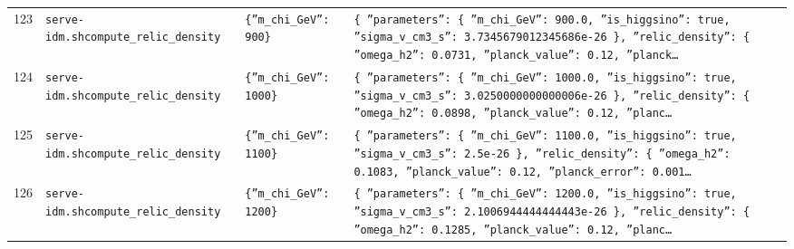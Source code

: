 \documentclass[11pt,a4paper]{article}
\begin{document}
\begin{longtable}{@{}p{}p{}p{}p{}@{}}
123 & \texttt{serve-idm.sh}\newline\texttt{compute\_\allowbreak{}relic\_\allowbreak{}density} & \texttt{\{''m\_\allowbreak{}chi\_\allowbreak{}GeV'':\allowbreak{} 900\}\allowbreak{}} & \texttt{\{   ''parameters'':\allowbreak{} \{     ''m\_\allowbreak{}chi\_\allowbreak{}GeV'':\allowbreak{} 900.0,\allowbreak{}     ''is\_\allowbreak{}higgsino'':\allowbreak{} true,\allowbreak{}     ''sigma\_\allowbreak{}v\_\allowbreak{}cm3\_\allowbreak{}s'':\allowbreak{} 3.7345679012345686e-26   \}\allowbreak{},\allowbreak{}   ''relic\_\allowbreak{}density'':\allowbreak{} \{     ''omega\_\allowbreak{}h2'':\allowbreak{} 0.0731,\allowbreak{}     ''planck\_\allowbreak{}value'':\allowbreak{} 0.12,\allowbreak{}     ''planck\ldots{}\allowbreak{}} \\
124 & \texttt{serve-idm.sh}\newline\texttt{compute\_\allowbreak{}relic\_\allowbreak{}density} & \texttt{\{''m\_\allowbreak{}chi\_\allowbreak{}GeV'':\allowbreak{} 1000\}\allowbreak{}} & \texttt{\{   ''parameters'':\allowbreak{} \{     ''m\_\allowbreak{}chi\_\allowbreak{}GeV'':\allowbreak{} 1000.0,\allowbreak{}     ''is\_\allowbreak{}higgsino'':\allowbreak{} true,\allowbreak{}     ''sigma\_\allowbreak{}v\_\allowbreak{}cm3\_\allowbreak{}s'':\allowbreak{} 3.0250000000000006e-26   \}\allowbreak{},\allowbreak{}   ''relic\_\allowbreak{}density'':\allowbreak{} \{     ''omega\_\allowbreak{}h2'':\allowbreak{} 0.0898,\allowbreak{}     ''planck\_\allowbreak{}value'':\allowbreak{} 0.12,\allowbreak{}     ''planc\ldots{}\allowbreak{}} \\
125 & \texttt{serve-idm.sh}\newline\texttt{compute\_\allowbreak{}relic\_\allowbreak{}density} & \texttt{\{''m\_\allowbreak{}chi\_\allowbreak{}GeV'':\allowbreak{} 1100\}\allowbreak{}} & \texttt{\{   ''parameters'':\allowbreak{} \{     ''m\_\allowbreak{}chi\_\allowbreak{}GeV'':\allowbreak{} 1100.0,\allowbreak{}     ''is\_\allowbreak{}higgsino'':\allowbreak{} true,\allowbreak{}     ''sigma\_\allowbreak{}v\_\allowbreak{}cm3\_\allowbreak{}s'':\allowbreak{} 2.5e-26   \}\allowbreak{},\allowbreak{}   ''relic\_\allowbreak{}density'':\allowbreak{} \{     ''omega\_\allowbreak{}h2'':\allowbreak{} 0.1083,\allowbreak{}     ''planck\_\allowbreak{}value'':\allowbreak{} 0.12,\allowbreak{}     ''planck\_\allowbreak{}error'':\allowbreak{} 0.001\ldots{}\allowbreak{}} \\
126 & \texttt{serve-idm.sh}\newline\texttt{compute\_\allowbreak{}relic\_\allowbreak{}density} & \texttt{\{''m\_\allowbreak{}chi\_\allowbreak{}GeV'':\allowbreak{} 1200\}\allowbreak{}} & \texttt{\{   ''parameters'':\allowbreak{} \{     ''m\_\allowbreak{}chi\_\allowbreak{}GeV'':\allowbreak{} 1200.0,\allowbreak{}     ''is\_\allowbreak{}higgsino'':\allowbreak{} true,\allowbreak{}     ''sigma\_\allowbreak{}v\_\allowbreak{}cm3\_\allowbreak{}s'':\allowbreak{} 2.1006944444444443e-26   \}\allowbreak{},\allowbreak{}   ''relic\_\allowbreak{}density'':\allowbreak{} \{     ''omega\_\allowbreak{}h2'':\allowbreak{} 0.1285,\allowbreak{}     ''planck\_\allowbreak{}value'':\allowbreak{} 0.12,\allowbreak{}     ''planc\ldots{}\allowbreak{}} \\

\end{longtable}
\end{document}

